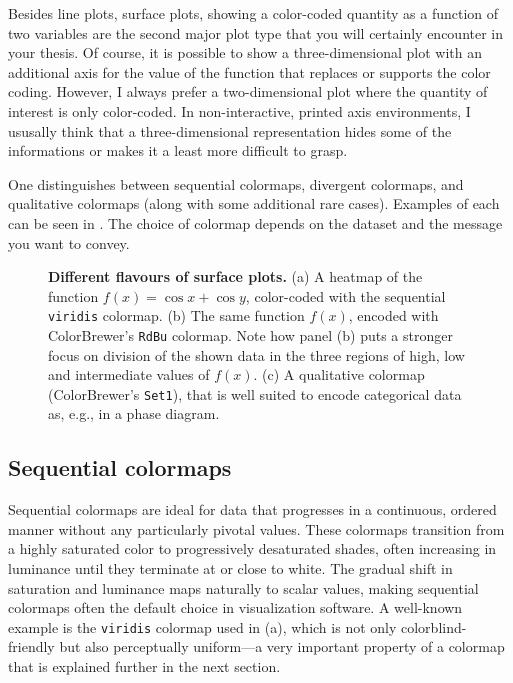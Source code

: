 Besides line plots, surface plots, showing a color-coded quantity as a function of two variables are the second major plot type that you will certainly encounter in your thesis. Of course, it is possible to show a three-dimensional plot with an additional axis for the value of the function that replaces or supports the color coding. However, I always prefer a two-dimensional plot where the quantity of interest is only color-coded. In non-interactive, printed axis environments, I ususally think that a three-dimensional representation hides some of the informations or makes it a least more difficult to grasp.

One distinguishes between sequential colormaps, divergent colormaps, and qualitative colormaps (along with some additional rare cases). Examples of each can be seen in . The choice of colormap depends on the dataset and the message you want to convey.

\begin{figure}
	\centering
	
	\caption{\textbf{Different flavours of surface plots.} (a) A heatmap of the function $f(x) = \cos x + \cos y$, color-coded with the sequential \texttt{viridis} colormap. (b) The same function $f(x)$, encoded with ColorBrewer’s \texttt{RdBu} colormap. Note how panel (b) puts a stronger focus on division of the shown data in the three regions of high, low and intermediate values of $f(x)$. (c) A qualitative colormap (ColorBrewer's \texttt{Set1}), that is well suited to encode categorical data as, e.g., in a phase diagram. }
	\label{fig:surfaceplotflavours}
\end{figure}


\subsection{Sequential colormaps}
Sequential colormaps are ideal for data that progresses in a continuous, ordered manner without any particularly pivotal values. These colormaps transition from a highly saturated color to progressively desaturated shades, often increasing in luminance until they terminate at or close to white. The gradual shift in saturation and luminance maps naturally to scalar values, making sequential colormaps often the default choice in visualization software. A well-known example is the \texttt{viridis} colormap used in (a), which is not only colorblind-friendly but also perceptually uniform---a very important property of a colormap that is explained further in the next section.

